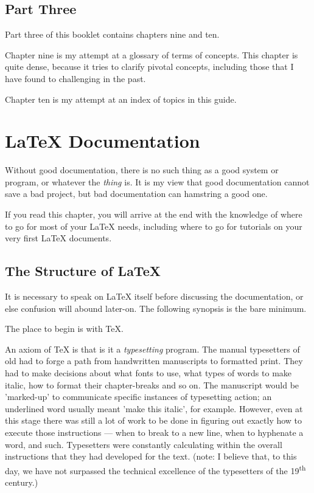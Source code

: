 \documentclass[12pt, oneside]{memoir}
\begin{document}
\section{Part Three}
Part three of this booklet contains chapters nine and ten.

Chapter nine is my attempt at a glossary of terms of concepts. This chapter is quite dense, because it tries to clarify pivotal concepts, including those that I have found to challenging in the past. 

Chapter ten is my attempt at an index of topics in this guide.

\chapter{\LaTeX{} Documentation}
Without good documentation, there is no such thing as a good system or program, or whatever the \emph{thing} is. It is my view that good documentation cannot save a bad project, but bad documentation can hamstring a good one.

If you read this chapter, you will arrive at the end with the knowledge of where to go for most of your \LaTeX{} needs, including where to go for tutorials on your very first \LaTeX{} documents.

\section{The Structure of \LaTeX{}}

It is necessary to speak on LaTeX itself before discussing the documentation, or else confusion will abound later-on. The following synopsis is the bare minimum.

The place to begin is with \TeX{}.

An axiom of \TeX{} is that is it a \emph{typesetting} program. The manual typesetters of old had to forge a path from handwritten manuscripts to formatted print. They had to make decisions about what fonts to use, what types of words to make italic, how to format their chapter-breaks and so on. The manuscript would be 'marked-up' to communicate specific instances of typesetting action; an underlined word usually meant 'make this italic', for example. However, even at this stage there was still a lot of work to be done in figuring out exactly how to execute those instructions — when to break to a new line, when to hyphenate a word, and such. Typesetters were constantly calculating within the overall instructions that they had developed for the text. (note: I believe that, to this day, we have not surpassed the technical excellence of the typesetters of the 19\textsuperscript{th} century.)
\end{document}
